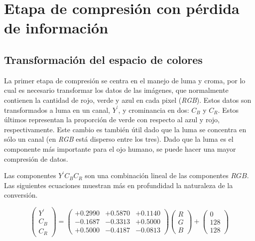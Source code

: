 \documentclass[%
	final,
	reprint,
	notitlepage,
	narroweqnarray,
	inline,
	twoside,
	invited
	]{ieee}
\begin{document}

\section{Etapa de compresión con pérdida de información}

\subsection{Transformación del espacio de colores}

\par La primer etapa de compresión se centra en el manejo de luma y croma, por lo cual es necesario transformar 
los datos de las imágenes, que normalmente contienen la cantidad de rojo, verde y azul en cada pixel (\textit{RGB}). 
Estos datos son transformados a luma en un canal, $Y^{'}$, y crominancia en dos: $C_B$ y $C_R$. Estos últimos 
 representan la proporción de verde con respecto al azul y rojo, respectivamente. 
 Este cambio es también útil dado que la luma se concentra 
en sólo un canal (en \textit{RGB} está disperso entre los tres). Dado que la luma es el componente más 
importante para el ojo humano, se puede hacer una mayor compresión de datos.

\par Las componentes $Y^{'}C_BC_R$ son una combinación lineal de las componentes $RGB$. Las siguientes ecuaciones 
 muestran más en profundidad la naturaleza de la conversión.

\[
 \begin{pmatrix} Y^{'} \\ C_B \\ C_R \end{pmatrix} = \begin{pmatrix} +0.2990 & +0.5870 & +0.1140 \\
-0.1687 & -0.3313 & +0.5000 \\
+0.5000 & -0.4187 & -0.0813  \end{pmatrix} \begin{pmatrix}R \\ G \\ B\end{pmatrix} + \begin{pmatrix}0 \\ 128 \\ 128\end{pmatrix}
\]
\end{document}
